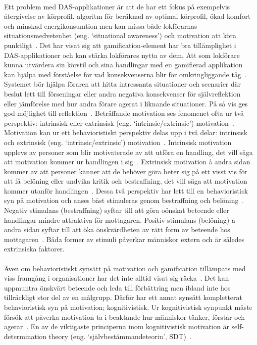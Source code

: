 \paragraph{}
\hspace{-11}Ett problem med DAS-applikationer är att de har ett fokus på exempelvis återgivelse av körprofil, algoritm för beräknad av optimal körprofil, ökad komfort och minskad energikonsumtion men kan missa både lokförarnas situationsmedvetenhet (eng. \lq{}situational awareness\rq{}) och motivation att köra punktligt~\cite{Bae2014, Cwil2018}.
Det har visat sig att gamification-element har bra tillämplighet i DAS-applikationer och kan stärka lokförares nytta av dem.
Att som lokförare kunna utvärdera sin körstil och sina handlingar med en gamifierad applikation kan hjälpa med förståelse för vad konsekvenserna blir för omkringliggande tåg~\cite{Bae2014}.
Systemet bör hjälpa föraren att hitta intressanta situationer och scenarier där beslut lett till förseningar eller andra negativa konsekvenser för självreflektion eller jämförelse med hur andra förare agerat i liknande situationer.
På så vis ges god möjlighet till reflektion~\cite{Bae2014}.
Beträffande motivation ses fenomenet ofta ur två perspektiv: intrinsisk eller extrinsisk (eng. \lq{}intrinsic/extrinsic\rq{}) motivation~\cite{Cwil2018}.
Motivation kan ur ett behavioristiskt perspektiv delas upp i två delar: intrinsisk och extrinsisk (eng. \lq{}intrinsic/extrinsic\rq{}) motivation~\cite{Cwil2018}.
Intrinsisk motivation upplevs av personer som blir motivaterade av att utföra en handling, det vill säga att motivation kommer ur handlingen i sig~\cite{Cwil2018}.
Extrinsisk motivation å andra sidan kommer av att personer känner att de behöver göra beter sig på ett visst vis för att få belöning eller undvika kritik och bestraffning, det vill säga att motivation kommer utanför handlingen~\cite{Cwil2018}.
Dessa två perspektiv har lett till en behavioristisk syn på motivation och anses bäst stimuleras genom bestraffning och belöning~\cite{Cwil2018}.
Negativ stimulans (bestraffning) syftar till att göra oönskat beteende eller handlingar mindre attraktiva för mottagaren.
Positiv stimulans (belöning) å andra sidan syftar till att öka önskvärdheten av rätt form av beteende hos mottagaren~\cite{Cwil2018}.
Båda former av stimuli påverkar människor extern och är således extrinsiska faktorer.
\paragraph{}
\hspace{-11}Även om behavioristiskt synsätt på motivation och gamification tillämpats med viss framgång i organisationer har det inte alltid visat sig räcka~\cite{Cwil2018}.
Det kan uppmuntra önskvärt beteende och leda till förbättring men ibland inte hos tillräckligt stor del av en målgrupp.
Därför har ett annat synsätt kompletterat behavioristisk syn på motivation; kognitivistisk.
Ur kognitivistisk synpunkt måste försök att påverka motivation ta i beaktande hur människor tänker, förstår och agerar~\cite{Cwil2018}.
En av de viktigaste principerna inom kognitivistisk motivation är self-determination theory (eng. \lq{}självbestämmandeteorin\rq{}, SDT)~\cite{Cwil2018}.
